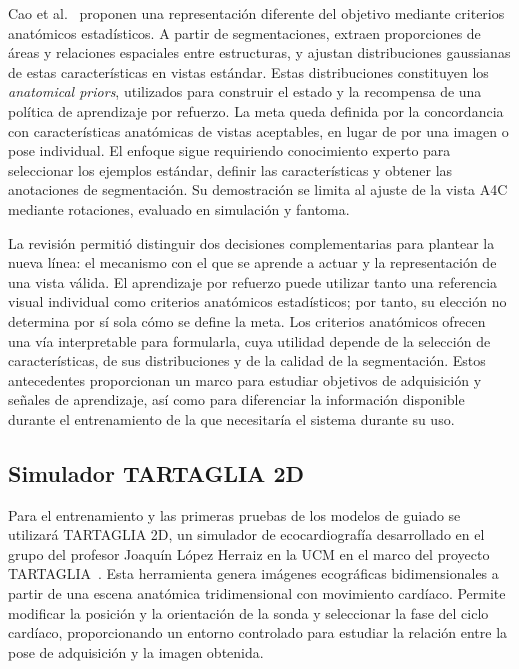 \documentclass[10pt,a4paper]{article}
\begin{document}
Cao et al.~\cite{Cao2026} proponen una representación diferente del objetivo mediante criterios anatómicos estadísticos. A partir de segmentaciones, extraen proporciones de áreas y relaciones espaciales entre estructuras, y ajustan distribuciones gaussianas de estas características en vistas estándar. Estas distribuciones constituyen los \textit{anatomical priors}, utilizados para construir el estado y la recompensa de una política de aprendizaje por refuerzo. La meta queda definida por la concordancia con características anatómicas de vistas aceptables, en lugar de por una imagen o pose individual. El enfoque sigue requiriendo conocimiento experto para seleccionar los ejemplos estándar, definir las características y obtener las anotaciones de segmentación. Su demostración se limita al ajuste de la vista A4C mediante rotaciones, evaluado en simulación y fantoma.

La revisión permitió distinguir dos decisiones complementarias para plantear la nueva línea: el mecanismo con el que se aprende a actuar y la representación de una vista válida. El aprendizaje por refuerzo puede utilizar tanto una referencia visual individual como criterios anatómicos estadísticos; por tanto, su elección no determina por sí sola cómo se define la meta. Los criterios anatómicos ofrecen una vía interpretable para formularla, cuya utilidad depende de la selección de características, de sus distribuciones y de la calidad de la segmentación. Estos antecedentes proporcionan un marco para estudiar objetivos de adquisición y señales de aprendizaje, así como para diferenciar la información disponible durante el entrenamiento de la que necesitaría el sistema durante su uso.

\subsection{Simulador TARTAGLIA 2D}\label{sec:simulador_tartaglia}
Para el entrenamiento y las primeras pruebas de los modelos de guiado se utilizará TARTAGLIA 2D, un simulador de ecocardiografía desarrollado en el grupo del profesor Joaquín López Herraiz en la UCM en el marco del proyecto TARTAGLIA~\cite{ProyectoTartaglia2021}. Esta herramienta genera imágenes ecográficas bidimensionales a partir de una escena anatómica tridimensional con movimiento cardíaco. Permite modificar la posición y la orientación de la sonda y seleccionar la fase del ciclo cardíaco, proporcionando un entorno controlado para estudiar la relación entre la pose de adquisición y la imagen obtenida.
\end{document}
